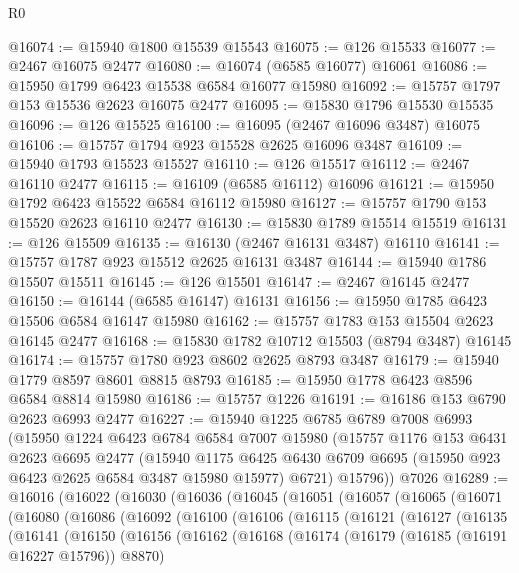 \begin{lexlean}{R0}
\begin{coremodule}
@16074 := @15940 @1800 @15539 @15543
@16075 := @126 @15533
@16077 := @2467 @16075 @2477
@16080 := @16074 (@6585 @16077) @16061
@16086 := @15950 @1799 @6423 @15538 @6584 @16077 @15980
@16092 := @15757 @1797 @153 @15536 @2623 @16075 @2477
@16095 := @15830 @1796 @15530 @15535
@16096 := @126 @15525
@16100 := @16095 (@2467 @16096 @3487) @16075
@16106 := @15757 @1794 @923 @15528 @2625 @16096 @3487
@16109 := @15940 @1793 @15523 @15527
@16110 := @126 @15517
@16112 := @2467 @16110 @2477
@16115 := @16109 (@6585 @16112) @16096
@16121 := @15950 @1792 @6423 @15522 @6584 @16112 @15980
@16127 := @15757 @1790 @153 @15520 @2623 @16110 @2477
@16130 := @15830 @1789 @15514 @15519
@16131 := @126 @15509
@16135 := @16130 (@2467 @16131 @3487) @16110
@16141 := @15757 @1787 @923 @15512 @2625 @16131 @3487
@16144 := @15940 @1786 @15507 @15511
@16145 := @126 @15501
@16147 := @2467 @16145 @2477
@16150 := @16144 (@6585 @16147) @16131
@16156 := @15950 @1785 @6423 @15506 @6584 @16147 @15980
@16162 := @15757 @1783 @153 @15504 @2623 @16145 @2477
@16168 := @15830 @1782 @10712 @15503 (@8794 @3487) @16145
@16174 := @15757 @1780 @923 @8602 @2625 @8793 @3487
@16179 := @15940 @1779 @8597 @8601 @8815 @8793
@16185 := @15950 @1778 @6423 @8596 @6584 @8814 @15980
@16186 := @15757 @1226
@16191 := @16186 @153 @6790 @2623 @6993 @2477
@16227 := @15940
    @1225
    @6785
    @6789
    @7008
    @6993
    (@15950
      @1224
      @6423
      @6784
      @6584
      @7007
      @15980
      (@15757
        @1176
        @153
        @6431
        @2623
        @6695
        @2477
        (@15940
          @1175
          @6425
          @6430
          @6709
          @6695
          (@15950 @923 @6423 @2625 @6584 @3487 @15980 @15977)
          @6721)
        @15796))
    @7026
@16289 := @16016
    (@16022
      (@16030
        (@16036
          (@16045
            (@16051
              (@16057
                (@16065
                  (@16071
                    (@16080
                      (@16086
                        (@16092
                          (@16100
                            (@16106
                              (@16115
                                (@16121
                                  (@16127
                                    (@16135
                                      (@16141
                                        (@16150
                                          (@16156
                                            (@16162
                                              (@16168
                                                (@16174
                                                  (@16179 (@16185 (@16191 @16227 @15796)) @8870)

\end{coremodule}
\end{lexlean}
